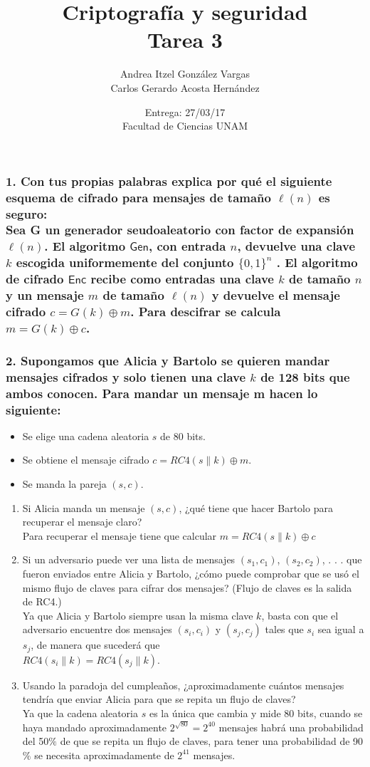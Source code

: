 \documentclass[12pt]{article}
\title{Criptografía y seguridad \\ Tarea 3}
\author{Andrea Itzel González Vargas \\ Carlos Gerardo Acosta Hernández}
\date{Entrega: 27/03/17 \\ Facultad de Ciencias UNAM}
\begin{document}
\maketitle
\subsubsection*{1. Con tus propias palabras explica por qué el siguiente esquema de cifrado para mensajes de tamaño $\ell(n)$ es seguro: \\
Sea G un generador seudoaleatorio con factor de expansión $\ell (n)$. El algoritmo $\textsf{Gen}$, con entrada $n$, devuelve una clave $k$ escogida uniformemente del conjunto $\{0, 1\}^n$ . El algoritmo de cifrado $\textsf{Enc}$ recibe como entradas una clave $k$ de tamaño $n$ y un mensaje $m$ de tamaño $\ell (n)$ y devuelve el mensaje cifrado $c = G(k) \oplus m$. Para descifrar se calcula $m = G(k) \oplus c$.}


\subsubsection*{2. Supongamos que Alicia y Bartolo se quieren mandar mensajes cifrados y solo tienen una clave $k$ de 128 bits que ambos conocen. Para mandar un mensaje m hacen lo siguiente:}
\begin{itemize}
\item Se elige una cadena aleatoria $s$ de 80 bits.
\item Se obtiene el mensaje cifrado $c = RC4(s \parallel k) \oplus m$.
\item Se manda la pareja $(s, c)$.
\end{itemize}
\begin{enumerate}[label=\alph*)]
\item Si Alicia manda un mensaje $(s, c)$, ¿qué tiene que hacer Bartolo para recuperar el mensaje claro? \\
Para recuperar el mensaje tiene que calcular $m = RC4(s \parallel k) \oplus c$
  
\item Si un adversario puede ver una lista de mensajes $(s_1, c_1)$, $(s_2, c_2)$, . . . que fueron enviados entre Alicia y Bartolo, ¿cómo puede comprobar que se usó el mismo flujo de claves para cifrar dos mensajes? (Flujo de claves es la salida de RC4.) \\  
  Ya que Alicia y Bartolo siempre usan la misma clave $k$, basta con que el adversario encuentre dos mensajes $(s_i, c_i)$ y $(s_j, c_j)$ tales que $s_i$ sea igual a $s_j$, de manera que sucederá que \\ $RC4(s_i \parallel k) = RC4(s_j \parallel k)$.
  
\item Usando la paradoja del cumpleaños, ¿aproximadamente cuántos mensajes tendría que enviar Alicia para que se repita un flujo de claves? \\
 Ya que la cadena aleatoria $s$ es la única que cambia y mide 80 bits, cuando se haya mandado aproximadamente $2^{\sqrt{80}} = 2^{40}$ mensajes habrá una probabilidad del 50$\%$ de que se repita un flujo de claves, para tener una probabilidad de 90$\%$ se necesita aproximadamente de $2^{41}$ mensajes.
\end{enumerate}
\end{document}
